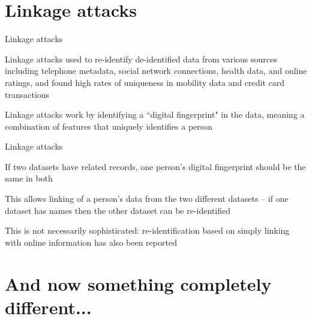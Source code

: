 \documentclass[12pt,aspectratio=169,handout]{beamer}
\begin{document}
\section{Linkage attacks}


\begin{frame}{Linkage attacks}

Linkage attacks used to re-identify de-identified data from various sources including telephone metadata, social network connections, health data, and online ratings, and found high rates of uniqueness in mobility data and credit card transactions

Linkage attacks work by identifying a ``digital fingerprint" in the data, meaning a combination of features that uniquely identifies a person



\end{frame}


\begin{frame}{Linkage attacks}

If two datasets have related records, one person’s digital fingerprint should be the same in both

This allows linking of a person's data from the two different datasets -- if one dataset has names then the other dataset can be re-identified

This is not necessarily sophisticated: re-identification based on simply linking with online information has also been reported


\end{frame}


\section{And now something completely different...}
\end{document}

